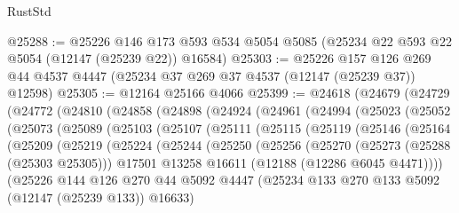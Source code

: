 \begin{lexlean}{RustStd}
\begin{coremodule}
@25288 := @25226
    @146
    @173
    @593
    @534
    @5054
    @5085
    (@25234 @22 @593 @22 @5054 (@12147 (@25239 @22)) @16584)
@25303 := @25226
    @157
    @126
    @269
    @44
    @4537
    @4447
    (@25234 @37 @269 @37 @4537 (@12147 (@25239 @37)) @12598)
@25305 := @12164 @25166 @4066
@25399 := @24618
    (@24679
      (@24729
        (@24772
          (@24810
            (@24858
              (@24898
                (@24924
                  (@24961
                    (@24994
                      (@25023
                        (@25052
                          (@25073
                            (@25089
                              (@25103
                                (@25107
                                  (@25111
                                    (@25115
                                      (@25119
                                        (@25146
                                          (@25164
                                            (@25209
                                              (@25219
                                                (@25224
                                                  (@25244
                                                    (@25250
                                                      (@25256
                                                        (@25270
                                                          (@25273 (@25288 (@25303 @25305)))
                                                          @17501
                                                          @13258
                                                          @16611
                                                          (@12188 (@12286 @6045 @4471))))
                                                      (@25226
                                                        @144
                                                        @126
                                                        @270
                                                        @44
                                                        @5092
                                                        @4447
                                                        (@25234
                                                          @133
                                                          @270
                                                          @133
                                                          @5092
                                                          (@12147 (@25239 @133))
                                                          @16633)

\end{coremodule}
\end{lexlean}
